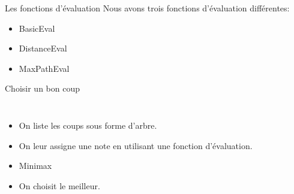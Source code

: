 \documentclass{beamer}
\begin{document}
	\begin{frame}{Les fonctions d'évaluation}
		Nous avons trois fonctions d'évaluation différentes:

		\vspace{1em}
		\begin{itemize}
			\pause \item BasicEval
			\vspace{0.75em}
			\pause \item DistanceEval
			\vspace{0.75em}
			\pause \item MaxPathEval
		\end{itemize}
	\end{frame}

	\begin{frame}{Choisir un bon coup}
		\begin{columns}
				\begin{itemize}
					\item<1-> On liste les coups sous forme d'arbre.
					\vspace{0.75em}
					\item<2-> On leur assigne une note en utilisant une fonction d'évaluation.
					\vspace{0.75em}
					\item<3-> Minimax
					\vspace{0.75em}
					\item<5-> On choisit le meilleur.
				\end{itemize}


\end{columns}
\end{frame}
\end{document}
